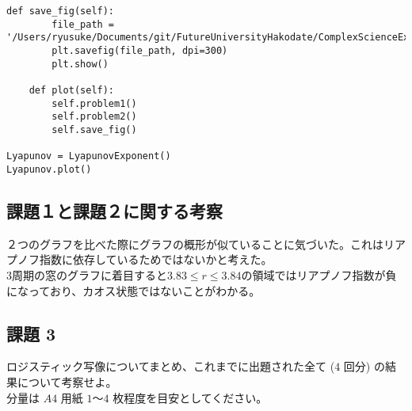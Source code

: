 \documentclass[a4j]{jsarticle}
\begin{document}
\begin{lstlisting}[caption=Pythonによるリアプノフ指数の依存性を示したグラフの描画]
    def save_fig(self):
        file_path = '/Users/ryusuke/Documents/git/FutureUniversityHakodate/ComplexScienceExercise/result/week04_1019163'
        plt.savefig(file_path, dpi=300)
        plt.show()

    def plot(self):
        self.problem1()
        self.problem2()
        self.save_fig()

Lyapunov = LyapunovExponent()
Lyapunov.plot()
\end{lstlisting}

\newpage

\subsection{課題１と課題２に関する考察}
２つのグラフを比べた際にグラフの概形が似ていることに気づいた。これはリアプノフ指数に依存しているためではないかと考えた。\\
3周期の窓のグラフに着目すると$3.83≤ r ≤3.84$の領域ではリアプノフ指数が負になっており、カオス状態ではないことがわかる。

\newpage

\subsection{課題 3}
  ロジスティック写像についてまとめ、これまでに出題された全て ($4$ 回分) の結果について考察せよ。\\
分量は $A4$ 用紙 $1$～$4$ 枚程度を目安としてください。\\
\end{document}
